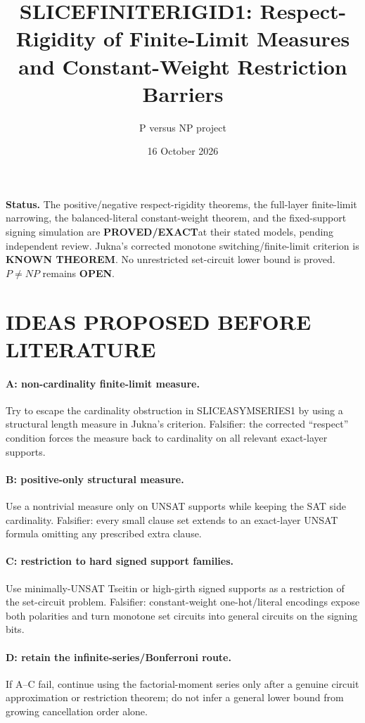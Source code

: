 \documentclass[11pt]{article}
\title{SLICEFINITERIGID1: Respect-Rigidity of Finite-Limit Measures and Constant-Weight Restriction Barriers}
\author{P versus NP project}
\date{16 October 2026}
\newcommand{\EXACT}{\textbf{PROVED/EXACT}}
\newcommand{\KNOWN}{\textbf{KNOWN THEOREM}}
\newcommand{\OPEN}{\textbf{OPEN}}
\begin{document}
\maketitle

\noindent\textbf{Status.} The positive/negative respect-rigidity theorems, the full-layer finite-limit narrowing, the balanced-literal constant-weight theorem, and the fixed-support signing simulation are \EXACT at their stated models, pending independent review. Jukna's corrected monotone switching/finite-limit criterion is \KNOWN. No unrestricted set-circuit lower bound is proved. $P\ne NP$ remains \OPEN.

\section{IDEAS PROPOSED BEFORE LITERATURE}
\paragraph{A: non-cardinality finite-limit measure.} Try to escape the cardinality obstruction in SLICEASYMSERIES1 by using a structural length measure in Jukna's criterion. Falsifier: the corrected ``respect'' condition forces the measure back to cardinality on all relevant exact-layer supports.
\paragraph{B: positive-only structural measure.} Use a nontrivial measure only on UNSAT supports while keeping the SAT side cardinality. Falsifier: every small clause set extends to an exact-layer UNSAT formula omitting any prescribed extra clause.
\paragraph{C: restriction to hard signed support families.} Use minimally-UNSAT Tseitin or high-girth signed supports as a restriction of the set-circuit problem. Falsifier: constant-weight one-hot/literal encodings expose both polarities and turn monotone set circuits into general circuits on the signing bits.
\paragraph{D: retain the infinite-series/Bonferroni route.} If A--C fail, continue using the factorial-moment series only after a genuine circuit approximation or restriction theorem; do not infer a general lower bound from growing cancellation order alone.
\end{document}

